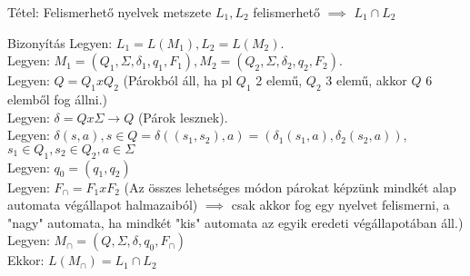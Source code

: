 \documentclass{beamer}
\begin{document}
\begin{frame}
\begin{block}{Tétel: Felismerhető nyelvek metszete}
$L_1, L_2$ felismerhető $\implies$ $L_1 \cap L_2$

\end{block}

\begin{block}{Bizonyítás}
Legyen: $L_1 = L(M_1), L_2 = L(M_2)$.\\
Legyen: $M_1 = (Q_1, \Sigma , {\delta}_1, q_1, F_1), M_2 = (Q_2, \Sigma , {\delta}_2, q_2, F_2)$.\\
Legyen: $Q = Q_1 x Q_2$ (Párokból áll, ha pl $Q_1$ 2 elemű, $Q_2$ 3 elemű, akkor $Q$ 6 elemből fog állni.)\\
Legyen: $\delta = Q x \Sigma \rightarrow Q$ (Párok lesznek).\\
Legyen: $\delta(s, a), s \in Q = \delta((s_1, s_2), a) = ({\delta}_1(s_1, a), {\delta}_2(s_2, a))$, $s_1 \in Q_1, s_2 \in Q_2, a \in \Sigma$\\
\bigskip
Legyen: $q_0 = (q_1, q_2)$\\
Legyen: \underline{\textbf{$F_{\cap} = F_1 x F_2$}} (Az összes lehetséges módon párokat képzünk mindkét alap automata végállapot halmazaiból) $\implies$ csak akkor fog egy nyelvet felismerni, a "nagy" automata, ha mindkét "kis" automata az egyik eredeti végállapotában áll.)\\
\smallskip
Legyen: $M_{\cap} = (Q, \Sigma , \delta , q_0, F_{\cap})$\\
\bigskip
Ekkor: \underline{$L(M_{\cap}) = L_1 \cap L_2$}\\
\end{block}

\end{frame}
\end{document}
